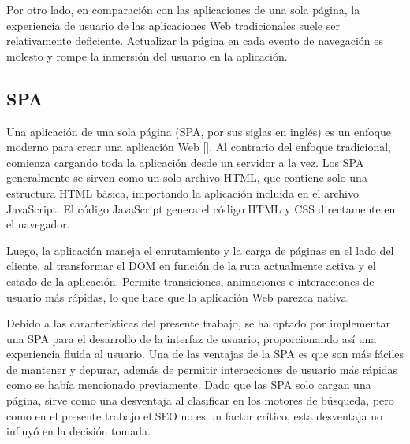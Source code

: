 Por otro lado, en comparación con las aplicaciones de una sola página, la experiencia de usuario de las aplicaciones Web tradicionales suele ser relativamente deficiente. Actualizar la página en cada evento de navegación es molesto y rompe la inmersión del usuario en la aplicación.

\subsection{SPA}
Una aplicación de una sola página (SPA, por sus siglas en inglés) es un enfoque moderno para crear una aplicación Web [\cite{101}]. Al contrario del enfoque tradicional, comienza cargando toda la aplicación desde un servidor a la vez. Los SPA generalmente se sirven como un solo archivo HTML, que contiene solo una estructura HTML básica, importando la aplicación incluida en el archivo JavaScript. El código JavaScript genera el código HTML y CSS directamente en el navegador.

Luego, la aplicación maneja el enrutamiento y la carga de páginas en el lado del cliente, al transformar el DOM en función de la ruta actualmente activa y el estado de la aplicación. Permite transiciones, animaciones e interacciones de usuario más rápidas, lo que hace que la aplicación Web parezca nativa.

Debido a las características del presente trabajo, se ha optado por implementar una SPA para el desarrollo de la interfaz de usuario, proporcionando así una experiencia fluida al usuario. Una de las ventajas de la SPA es que son más fáciles de mantener y depurar, además de permitir interacciones de usuario más rápidas como se había mencionado previamente. Dado que las SPA solo cargan una página, sirve como una desventaja al clasificar en los motores de búsqueda, pero como en el presente trabajo el SEO  no es un factor crítico, esta desventaja no influyó en la decisión tomada.

